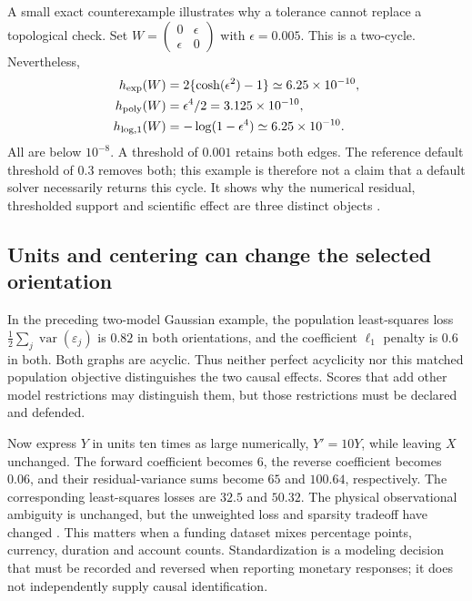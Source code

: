 A small exact counterexample illustrates why a tolerance cannot replace a
topological check. Set
\(W=\left(\begin{smallmatrix}0&\epsilon\\\epsilon&0\end{smallmatrix}\right)\)
with \(\epsilon=0.005\). This is a two-cycle. Nevertheless,
\begin{align}
 h_{\exp}(W)&=2\{\cosh(\epsilon^2)-1\}\simeq6.25\times10^{-10},\\
 h_{\rm poly}(W)&=\epsilon^4/2=3.125\times10^{-10},\\
 h_{\log,1}(W)&=-\log(1-\epsilon^4)\simeq6.25\times10^{-10}.
\end{align}
All are below \(10^{-8}\). A threshold of \(0.001\) retains both edges. The
reference default threshold of \(0.3\) removes both; this example is therefore
not a claim that a default solver necessarily returns this cycle. It shows
why the numerical residual, thresholded support and scientific effect are
three distinct objects \citep{exec13_pydisc_examples}.

\subsection{Units and centering can change the selected orientation}

In the preceding two-model Gaussian example, the population least-squares
loss \(\tfrac12\sum_j\operatorname{var}(\varepsilon_j)\) is \(0.82\) in
both orientations, and the coefficient \(\ell_1\) penalty is \(0.6\) in both.
Both graphs are acyclic. Thus neither perfect acyclicity nor this matched
population objective distinguishes the two causal effects. Scores that add
other model restrictions may distinguish them, but those restrictions must be
declared and defended.

Now express \(Y\) in units ten times as large numerically, \(Y'=10Y\), while
leaving \(X\) unchanged. The forward coefficient becomes \(6\), the reverse
coefficient becomes \(0.06\), and their residual-variance sums become \(65\)
and \(100.64\), respectively. The corresponding least-squares losses are
\(32.5\) and \(50.32\). The physical observational ambiguity is unchanged,
but the unweighted loss and sparsity tradeoff have changed
\citep{exec13_pydisc_examples}. This matters when a funding dataset mixes
percentage points, currency, duration and account counts. Standardization is a
modeling decision that must be recorded and reversed when reporting monetary
responses; it does not independently supply causal identification.

